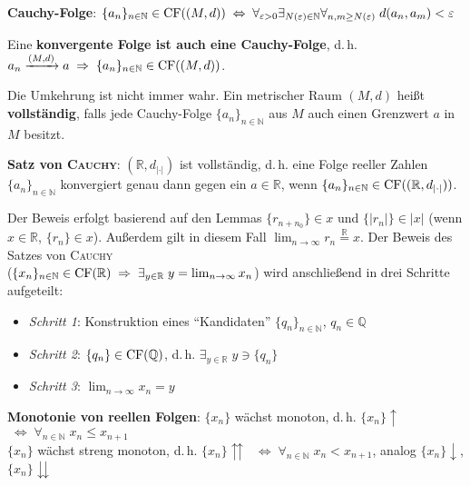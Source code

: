 \textbf{Cauchy-Folge}:
$\{a_n\}_{n \in \mathbb{N}} \in \operatorname{CF}((M,d)) \;\Leftrightarrow\;
\forall_{\varepsilon > 0} \exists_{N(\varepsilon) \in \mathbb{N}}
\forall_{n,m \ge N(\varepsilon)}\; d(a_n, a_m) < \varepsilon$

Eine \textbf{konvergente Folge ist auch eine Cauchy-Folge}, d.\,h. \\
$a_n \xrightarrow{(M,d)} a \;\Rightarrow\;
\{a_n\}_{n \in \mathbb{N}} \in \operatorname{CF}((M,d))$.

\pagebreak

Die Umkehrung ist nicht immer wahr. Ein metrischer Raum $(M,d)$ heißt
\textbf{vollständig}, falls jede Cauchy-Folge $\{a_n\}_{n \in \mathbb{N}}$
aus $M$ auch einen Grenzwert $a$ in $M$ besitzt.

\linie

\textbf{Satz von \textsc{Cauchy}}: $(\mathbb{R},d_{|\cdot|})$ ist vollständig,
d.\,h. eine Folge reeller Zahlen $\{a_n\}_{n \in \mathbb{N}}$ konvergiert genau
dann gegen ein $a \in \mathbb{R}$, wenn
$\{a_n\}_{n \in \mathbb{N}} \in \operatorname{CF}((\mathbb{R},d_{|\cdot|}))$.

Der Beweis erfolgt basierend auf den Lemmas $\{r_{n+n_0}\} \in x$ und
$\{|r_n|\} \in |x|$ (wenn $x \in \mathbb{R}$, $\{r_n\} \in x$). Außerdem
gilt in diesem Fall $\lim_{n \to \infty} r_n \overset{\mathbb{R}}{=} x$. Der
Beweis des Satzes von \textsc{Cauchy} \\
($\{x_n\}_{n \in \mathbb{N}} \in \operatorname{CF}(\mathbb{R}) \;\Rightarrow\;
\exists_{y \in \mathbb{R}}\; y = \lim_{n \to \infty} x_n$)
wird anschließend in drei Schritte aufgeteilt:

\begin{itemize}
    \item \emph{Schritt 1}: Konstruktion eines "`Kandidaten"'
    $\{q_n\}_{n \in \mathbb{N}}$, $q_n \in \mathbb{Q}$
    
    \item \emph{Schritt 2}: $\{q_n\} \in \operatorname{CF}(\mathbb{Q})$, d.\,h.
    $\exists_{y \in \mathbb{R}}\; y \ni \{q_n\}$
    
    \item \emph{Schritt 3}: $\lim_{n \to \infty} x_n = y$
\end{itemize}

\linie

\textbf{Monotonie von reellen Folgen}:
$\{x_n\}$ wächst monoton, d.\,h. $\{x_n\}\!\!\uparrow$
$\;\Leftrightarrow\; \forall_{n \in \mathbb{N}}\; x_n \le x_{n+1}$ \\
$\{x_n\}$ wächst streng monoton, d.\,h. $\{x_n\}\!\!\upuparrows$
$\;\Leftrightarrow\; \forall_{n \in \mathbb{N}}\; x_n < x_{n+1}$,
analog $\{x_n\}\!\!\downarrow$, $\{x_n\}\!\!\downdownarrows$

